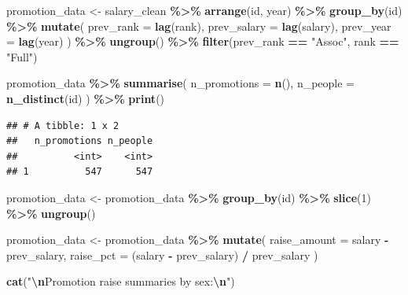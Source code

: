 \documentclass[
]{article}
\newenvironment{Shaded}{\begin{snugshade}}{\end{snugshade}}
\newcommand{\AttributeTok}[1]{\textcolor[rgb]{0.13,0.29,0.53}{#1}}
\newcommand{\DecValTok}[1]{\textcolor[rgb]{0.00,0.00,0.81}{#1}}
\newcommand{\FunctionTok}[1]{\textcolor[rgb]{0.13,0.29,0.53}{\textbf{#1}}}
\newcommand{\NormalTok}[1]{#1}
\newcommand{\OtherTok}[1]{\textcolor[rgb]{0.56,0.35,0.01}{#1}}
\newcommand{\SpecialCharTok}[1]{\textcolor[rgb]{0.81,0.36,0.00}{\textbf{#1}}}
\newcommand{\StringTok}[1]{\textcolor[rgb]{0.31,0.60,0.02}{#1}}
\begin{document}
\begin{Shaded}
\begin{Highlighting}[]
\NormalTok{promotion\_data }\OtherTok{\textless{}{-}}\NormalTok{ salary\_clean }\SpecialCharTok{\%\textgreater{}\%}
  \FunctionTok{arrange}\NormalTok{(id, year) }\SpecialCharTok{\%\textgreater{}\%}
  \FunctionTok{group\_by}\NormalTok{(id) }\SpecialCharTok{\%\textgreater{}\%}
  \FunctionTok{mutate}\NormalTok{(}
    \AttributeTok{prev\_rank =} \FunctionTok{lag}\NormalTok{(rank),}
    \AttributeTok{prev\_salary =} \FunctionTok{lag}\NormalTok{(salary),}
    \AttributeTok{prev\_year =} \FunctionTok{lag}\NormalTok{(year)}
\NormalTok{  ) }\SpecialCharTok{\%\textgreater{}\%}
  \FunctionTok{ungroup}\NormalTok{() }\SpecialCharTok{\%\textgreater{}\%}
  \FunctionTok{filter}\NormalTok{(prev\_rank }\SpecialCharTok{==} \StringTok{"Assoc"}\NormalTok{, rank }\SpecialCharTok{==} \StringTok{"Full"}\NormalTok{)}

\NormalTok{promotion\_data }\SpecialCharTok{\%\textgreater{}\%}
  \FunctionTok{summarise}\NormalTok{(}
    \AttributeTok{n\_promotions =} \FunctionTok{n}\NormalTok{(),}
    \AttributeTok{n\_people =} \FunctionTok{n\_distinct}\NormalTok{(id)}
\NormalTok{  ) }\SpecialCharTok{\%\textgreater{}\%}
  \FunctionTok{print}\NormalTok{()}
\end{Highlighting}
\end{Shaded}

\begin{verbatim}
## # A tibble: 1 x 2
##   n_promotions n_people
##          <int>    <int>
## 1          547      547
\end{verbatim}

\begin{Shaded}
\begin{Highlighting}[]
\NormalTok{promotion\_data }\OtherTok{\textless{}{-}}\NormalTok{ promotion\_data }\SpecialCharTok{\%\textgreater{}\%}
  \FunctionTok{group\_by}\NormalTok{(id) }\SpecialCharTok{\%\textgreater{}\%}
  \FunctionTok{slice}\NormalTok{(}\DecValTok{1}\NormalTok{) }\SpecialCharTok{\%\textgreater{}\%}
  \FunctionTok{ungroup}\NormalTok{()}
\end{Highlighting}
\end{Shaded}

\begin{Shaded}
\begin{Highlighting}[]
\NormalTok{promotion\_data }\OtherTok{\textless{}{-}}\NormalTok{ promotion\_data }\SpecialCharTok{\%\textgreater{}\%}
  \FunctionTok{mutate}\NormalTok{(}
    \AttributeTok{raise\_amount =}\NormalTok{ salary }\SpecialCharTok{{-}}\NormalTok{ prev\_salary,}
    \AttributeTok{raise\_pct =}\NormalTok{ (salary }\SpecialCharTok{{-}}\NormalTok{ prev\_salary) }\SpecialCharTok{/}\NormalTok{ prev\_salary}
\NormalTok{  )}

\FunctionTok{cat}\NormalTok{(}\StringTok{"}\SpecialCharTok{\textbackslash{}n}\StringTok{Promotion raise summaries by sex:}\SpecialCharTok{\textbackslash{}n}\StringTok{"}\NormalTok{)}
\end{Highlighting}
\end{Shaded}
\end{document}
